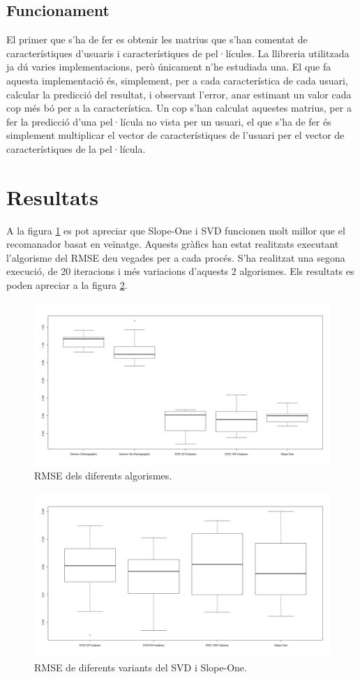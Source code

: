 \subsection{Funcionament}

El primer que s'ha de fer es obtenir les matrius que s'han comentat de característiques d'usuaris i característiques de pel·lícules. La llibreria utilitzada ja dú varies implementacions, però únicament n'he estudiada una. El que fa aquesta implementació és, simplement, per a cada característica de cada usuari, calcular la predicció del resultat, i observant l'error, anar estimant un valor cada cop més bó per a la característica. Un cop s'han calculat aquestes matrius, per a fer la predicció d'una pel·lícula no vista per un usuari, el que s'ha de fer és simplement multiplicar el vector de característiques de l'usuari per el vector de característiques de la pel·lícula.

\section{Resultats}

A la figura \ref{figure-rmse-scores} es pot apreciar que Slope-One i SVD funcionen molt millor que el recomanador basat en veïnatge. Aquests gràfics han estat realitzats executant l'algorisme del RMSE deu vegades per a cada procés. S'ha realitzat una segona execució, de 20 iteracions i més variacions d'aquests 2 algorismes. Els resultats es poden apreciar a la figura \ref{figure-rmse-scores-specific}.

\begin{figure}[h!]
  \caption{RMSE dels diferents algorismes.}
  \label{figure-rmse-scores}
  \centering
    \includegraphics[width=\textwidth]{figs/resultats_10iter.png}
\end{figure}

\begin{figure}[h!]
  \caption{RMSE de diferents variants del SVD i Slope-One.}
  \label{figure-rmse-scores-specific}
  \centering
    \includegraphics[width=\textwidth]{figs/resultats_20iter_specific.png}
\end{figure}